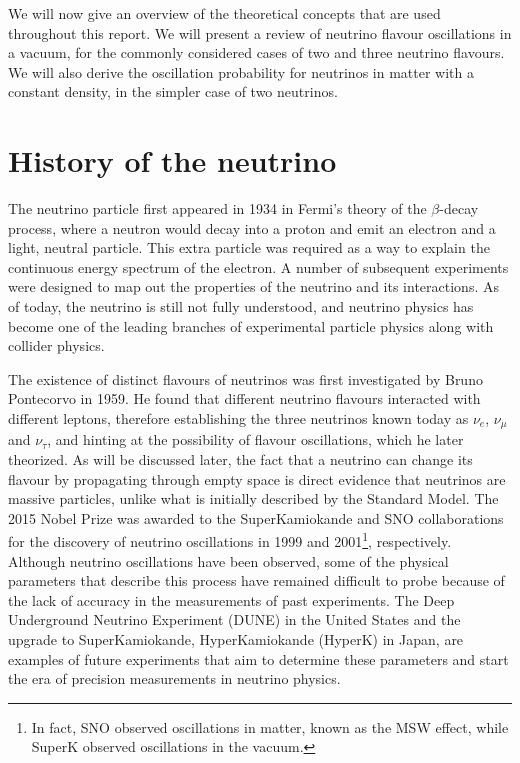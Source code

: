 \label{ch:introduction}
We will now give an overview of the theoretical concepts that are used
throughout this report. We will present a review of neutrino flavour
oscillations in a vacuum, for the commonly considered cases of two and three
neutrino flavours. We will also derive the oscillation probability for
neutrinos in matter with a constant density, in the simpler case of two
neutrinos. 


\section{History of the neutrino}
The neutrino particle first appeared in 1934 in Fermi's theory of the $\beta$-decay
process\cite{fermi}, where a neutron would decay into a proton and emit an electron and a
light, neutral particle. This extra particle was required as a way to explain the
continuous energy spectrum of the electron. A number of subsequent experiments
were designed to map out the properties of the neutrino and its
interactions\cite{zuber}. As of today, the neutrino is still not fully
understood, and neutrino physics has become one of the leading branches of
experimental particle physics along with collider physics. 

The existence of distinct flavours of neutrinos was first investigated by
Bruno Pontecorvo in 1959\cite{pontecorvo}. He found that different neutrino flavours
interacted with different leptons, therefore establishing the three neutrinos
known today as $\nu_e$, $\nu_\mu$ and $\nu_\tau$, and hinting at the
possibility of flavour oscillations, which he later theorized.
As will be discussed later, the fact that a neutrino can change its flavour by
propagating through empty space is direct evidence that neutrinos are massive
particles, unlike what is initially described by the Standard Model.
The 2015 Nobel Prize was awarded to the SuperKamiokande and SNO collaborations
for the discovery of neutrino oscillations in 1999 and 2001\footnote{In fact,
SNO observed oscillations in matter, known as the MSW effect\cite{smirnov},
while SuperK observed oscillations in the vacuum.}, respectively.
Although neutrino oscillations have been observed, some of the physical parameters that
describe this process have remained difficult to probe because of the lack of
accuracy in the measurements of past experiments. 
The Deep Underground Neutrino Experiment (DUNE) in the United States and the
upgrade to SuperKamiokande, HyperKamiokande (HyperK) in Japan, are examples of
future experiments that aim to determine these parameters and start the era of
precision measurements in neutrino physics.


